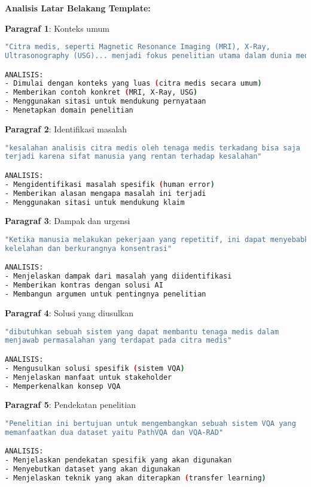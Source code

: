 \textbf{Analisis Latar Belakang Template:}

\textbf{Paragraf 1}: Konteks umum
\begin{lstlisting}[language=bash, style=bash, caption=Analisis Struktur Latar Belakang]
"Citra medis, seperti Magnetic Resonance Imaging (MRI), X-Ray,
Ultrasonography (USG)... menjadi fokus penelitian utama dalam dunia medis"

ANALISIS:
- Dimulai dengan konteks yang luas (citra medis secara umum)
- Memberikan contoh konkret (MRI, X-Ray, USG)
- Menggunakan sitasi untuk mendukung pernyataan
- Menetapkan domain penelitian
\end{lstlisting}

\textbf{Paragraf 2}: Identifikasi masalah
\begin{lstlisting}[language=bash, style=bash, caption=Identifikasi Masalah]
"kesalahan analisis citra medis oleh tenaga medis terkadang bisa saja
terjadi karena sifat manusia yang rentan terhadap kesalahan"

ANALISIS:
- Mengidentifikasi masalah spesifik (human error)
- Memberikan alasan mengapa masalah ini terjadi
- Menggunakan sitasi untuk mendukung klaim
\end{lstlisting}

\textbf{Paragraf 3}: Dampak dan urgensi
\begin{lstlisting}[language=bash, style=bash, caption=Dampak Masalah]
"Ketika manusia melakukan pekerjaan yang repetitif, ini dapat menyebabkan
kelelahan dan berkurangnya konsentrasi"

ANALISIS:
- Menjelaskan dampak dari masalah yang diidentifikasi
- Memberikan kontras dengan solusi AI
- Membangun argumen untuk pentingnya penelitian
\end{lstlisting}

\textbf{Paragraf 4}: Solusi yang diusulkan
\begin{lstlisting}[language=bash, style=bash, caption=Solusi yang Diusulkan]
"dibutuhkan sebuah sistem yang dapat membantu tenaga medis dalam
menjawab permasalahan yang terdapat pada citra medis"

ANALISIS:
- Mengusulkan solusi spesifik (sistem VQA)
- Menjelaskan manfaat untuk stakeholder
- Memperkenalkan konsep VQA
\end{lstlisting}

\textbf{Paragraf 5}: Pendekatan penelitian
\begin{lstlisting}[language=bash, style=bash, caption=Pendekatan Penelitian]
"Penelitian ini bertujuan untuk mengembangkan sebuah sistem VQA yang
memanfaatkan dua dataset yaitu PathVQA dan VQA-RAD"

ANALISIS:
- Menjelaskan pendekatan spesifik yang akan digunakan
- Menyebutkan dataset yang akan digunakan
- Menjelaskan teknik yang akan diterapkan (transfer learning)
\end{lstlisting}

